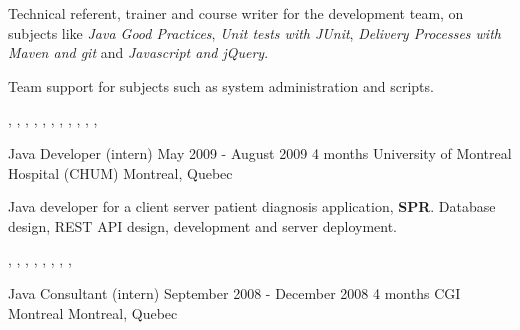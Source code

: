 \documentclass[a4paper]{article}
\begin{document}
\begin{cvexperience}
\begin{cvexperiencedescription}
    \item Technical referent, trainer and course writer for the development
      team, on subjects like \emph{Java Good Practices}, \emph{Unit tests with
      JUnit}, \emph{Delivery Processes with Maven and git} and \emph{Javascript
      and jQuery}.

    \item Team support for  subjects such as system
      administration and  scripts.
  \end{cvexperiencedescription}

  \begin{cvexperiencetech}[Technologies]%
    ,
    ,
    ,
    ,
    ,
    ,
    ,
    ,
    ,
    ,
    ,
  \end{cvexperiencetech}
  \begin{cvexperiencetech}[Culture]%
  \end{cvexperiencetech}
\end{cvexperience}


\cvexperiencetitle
{Java Developer {\small (intern)}}
{May 2009 - August 2009}
{4 months}
{University of Montreal Hospital (CHUM)}
{Montreal, Quebec}

\begin{cvexperience}%
  Java developer for a client server patient diagnosis application,
  \textbf{SPR}. Database design, REST API design, development and server
  deployment.

  \begin{cvexperiencetech}[Technologies]%
    ,
    ,
    ,
    ,
    ,
    ,
    ,
    ,
  \end{cvexperiencetech}
\end{cvexperience}


\cvexperiencetitle
{Java Consultant {\small (intern)}}
{September 2008 - December 2008}
{4 months}
{CGI Montreal}
{Montreal, Quebec}
\end{document}
